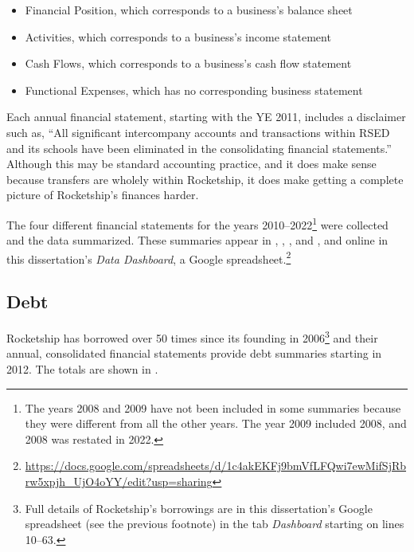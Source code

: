 \begin{itemize}
  \item Financial Position, which corresponds to a business's balance sheet\\
  \item Activities, which corresponds to a business's income statement\\
  \item Cash Flows, which corresponds to a business's cash flow statement\\
  \item Functional Expenses, which has no corresponding business statement\\
\end{itemize}

Each annual financial statement, starting with the YE 2011, includes a disclaimer such as, ``All significant intercompany accounts and transactions within RSED and its schools have been eliminated in the consolidating financial statements.'' Although this may be standard accounting practice, and it does make sense because transfers are wholely within Rocketship, it does make getting a complete picture of Rocketship's finances harder.

The four different financial statements for the years 2010–2022\footnote{The years 2008 and 2009 have not been included in some summaries because they were different from all the other years. The year 2009 included 2008, and 2008 was restated in 2022.} were collected and the data summarized. These summaries appear in , , , and , and online in this dissertation's \textit{Data Dashboard}, a Google spreadsheet.\footnote{\url{https://docs.google.com/spreadsheets/d/1c4akEKFj9bmVfLFQwi7ewMifSjRbrw5xpjh_UjO4oYY/edit?usp=sharing}}

\subsection{Debt}\label{sec:debt}\indent

Rocketship has borrowed over 50 times since its founding in 2006\footnote{Full details of Rocketship's borrowings are in this dissertation's Google spreadsheet (see the previous footnote) in the tab \textit{Dashboard} starting on lines 10–63.} 
and their annual, consolidated financial statements provide debt summaries starting in 2012. The totals are shown in . 

